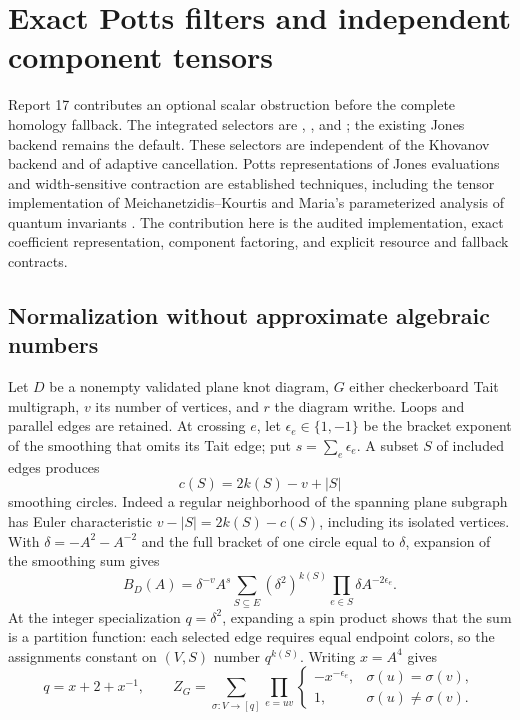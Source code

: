 \section{Exact Potts filters and independent component tensors}
\label{sec:potts-integration}

Report 17 contributes an optional scalar obstruction before the complete
homology fallback. The integrated selectors are ,
, and ; the existing
 Jones backend remains the default. These selectors are
independent of the Khovanov backend and of adaptive cancellation.
Potts representations of Jones evaluations and width-sensitive contraction
are established techniques, including the tensor implementation of
Meichanetzidis--Kourtis \cite{potts-tensor} and Maria's parameterized analysis
of quantum invariants \cite{quantum-width}. The contribution here is the
audited implementation, exact coefficient representation, component factoring,
and explicit resource and fallback contracts.

\subsection{Normalization without approximate algebraic numbers}
Let $D$ be a nonempty validated plane knot diagram, $G$ either checkerboard
Tait multigraph, $v$ its number of vertices, and $r$ the diagram writhe.
Loops and parallel edges are retained. At crossing $e$, let
$\epsilon_e\in\{1,-1\}$ be the bracket exponent of the smoothing that
omits its Tait edge; put $s=\sum_e\epsilon_e$.
A subset $S$ of included edges produces
\[
 c(S)=2k(S)-v+|S|
\]
smoothing circles. Indeed a regular neighborhood of the spanning plane
subgraph has Euler characteristic $v-|S|=2k(S)-c(S)$, including its isolated
vertices. With $\delta=-A^2-A^{-2}$ and the full bracket of one circle equal
to $\delta$, expansion of the smoothing sum gives
\[
 B_D(A)=\delta^{-v}A^s
 \sum_{S\subseteq E}(\delta^2)^{k(S)}
       \prod_{e\in S}\delta A^{-2\epsilon_e}.
\]
At the integer specialization $q=\delta^2$, expanding a spin product shows
that the sum is a partition function: each selected edge requires equal
endpoint colors, so the assignments constant on $(V,S)$ number $q^{k(S)}$.
Writing $x=A^4$ gives
\[
 q=x+2+x^{-1},\qquad
 Z_G=\sum_{\sigma:V\to[q]}\prod_{e=uv}
 \begin{cases}-x^{-\epsilon_e},&\sigma(u)=\sigma(v),\\
               1,&\sigma(u)\ne\sigma(v).
 \end{cases}
\]

